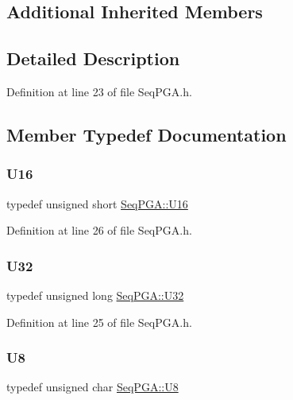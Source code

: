 \subsection*{Additional Inherited Members}


\subsection{Detailed Description}


Definition at line 23 of file Seq\+P\+G\+A.\+h.



\subsection{Member Typedef Documentation}
\mbox{\label{classSeqPGA_ab58f68f9484bdc99722a29f533f0d4e3}} 
\subsubsection{\texorpdfstring{U16}{U16}}
{\footnotesize\ttfamily typedef unsigned short \hyperlink{classSeqPGA_ab58f68f9484bdc99722a29f533f0d4e3}{Seq\+P\+G\+A\+::\+U16}}



Definition at line 26 of file Seq\+P\+G\+A.\+h.

\mbox{\label{classSeqPGA_a9e9a99e1d7586223a7c118a19deef42c}} 
\subsubsection{\texorpdfstring{U32}{U32}}
{\footnotesize\ttfamily typedef unsigned long \hyperlink{classSeqPGA_a9e9a99e1d7586223a7c118a19deef42c}{Seq\+P\+G\+A\+::\+U32}}



Definition at line 25 of file Seq\+P\+G\+A.\+h.

\mbox{\label{classSeqPGA_ace27b11f060e537a6fd756cc3eca5347}} 
\subsubsection{\texorpdfstring{U8}{U8}}
{\footnotesize\ttfamily typedef unsigned char \hyperlink{classSeqPGA_ace27b11f060e537a6fd756cc3eca5347}{Seq\+P\+G\+A\+::\+U8}}



